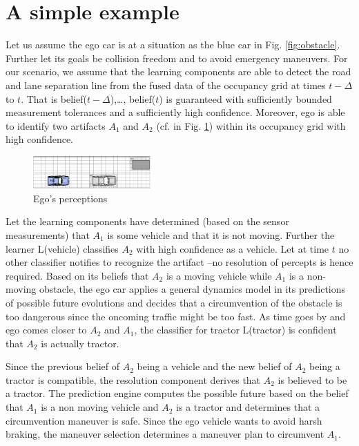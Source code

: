 \section{A simple example}\label{sec:example}
Let us assume the ego car is at a situation as the blue car in Fig. \ref{fig:obstacle}.  
Further let its goals be collision freedom and to avoid emergency maneuvers.
%
For our scenario, we assume  that the learning components are able to detect the road and lane separation line from the fused data of the occupancy grid at times $t-\Delta$ to $t$. That is belief($t-\Delta$),\ldots, belief($t$) is guaranteed with sufficiently bounded  measurement tolerances and a sufficiently high confidence. Moreover, ego is able to identify two artifacts $A_1$ and $A_2$ (cf. in Fig. \ref{fig:artifacts}) within its occupancy grid with high confidence.  

\begin{figure}
	\centering
	\includegraphics[width=0.4\textwidth]{ego+artifacts.eps}
	\caption{Ego's perceptions}\label{fig:artifacts}
\end{figure}
Let the learning components have determined (based on the sensor measurements) that $A_1$ is some vehicle and that it is not moving. 
Further the learner L(vehicle) classifies $A_2$  with high confidence as a vehicle. Let at time $t$ no other classifier notifies to recognize the artifact --no resolution of percepts is hence required. Based on its beliefs that $A_2$ is a moving vehicle while $A_1$ is a non-moving obstacle, the ego car applies a general dynamics model in its predictions of possible future evolutions and decides that a circumvention of the obstacle is too dangerous since the oncoming traffic might be too fast. As time goes by and ego comes closer to $A_2$ and $A_1$, the classifier for tractor L(tractor) is confident that  $A_2$ is actually tractor.

Since the previous belief of $A_2$ being a vehicle and the new belief of $A_2$ being a tractor is compatible, the resolution component derives that $A_2$ is believed to be a tractor. The prediction engine computes the possible future based on the belief that $A_1$ is a  non moving vehicle and $A_2$ is a tractor and determines that a circumvention maneuver is safe. Since the ego vehicle wants to avoid harsh braking, the maneuver selection determines a maneuver plan to circumvent $A_1$.

